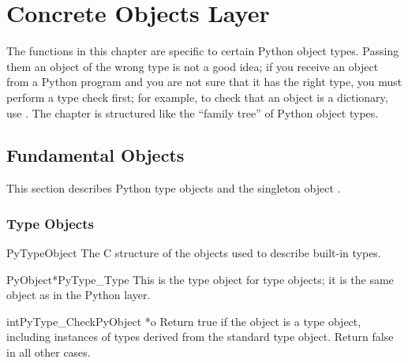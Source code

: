 \chapter{Concrete Objects Layer \label{concrete}}


The functions in this chapter are specific to certain Python object
types.  Passing them an object of the wrong type is not a good idea;
if you receive an object from a Python program and you are not sure
that it has the right type, you must perform a type check first;
for example, to check that an object is a dictionary, use
.  The chapter is structured like the
``family tree'' of Python object types.



\section{Fundamental Objects \label{fundamental}}

This section describes Python type objects and the singleton object
.


\subsection{Type Objects \label{typeObjects}}

\begin{ctypedesc}{PyTypeObject}
  The C structure of the objects used to describe built-in types.
\end{ctypedesc}

\begin{cvardesc}{PyObject*}{PyType_Type}
  This is the type object for type objects; it is the same object as
   in the Python layer.
\end{cvardesc}

\begin{cfuncdesc}{int}{PyType_Check}{PyObject *o}
  Return true if the object  is a type object, including
  instances of types derived from the standard type object.  Return
  false in all other cases.
\end{cfuncdesc}

